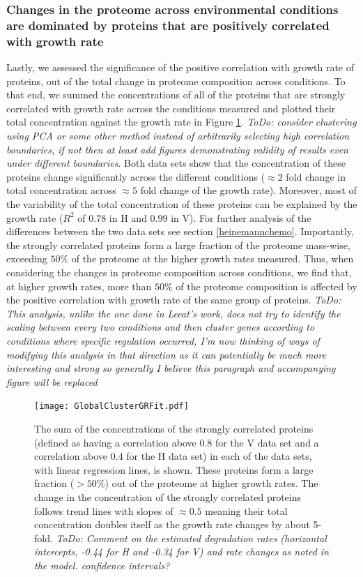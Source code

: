 \documentclass[notitlepage]{article}
\begin{document}
\subsubsection{Changes in the proteome across environmental conditions are dominated by proteins that are positively correlated with growth rate}
Lastly, we assessed the significance of the positive correlation with growth rate of proteins, out of the total change in proteome composition across conditions.
To that end, we summed the concentrations of all of the proteins that are strongly correlated with growth rate across the conditions measured and plotted their total concentration against the growth rate in Figure \ref{fig:globalgrcorr}.
\emph{ToDo: consider clustering using PCA or some other method instead of arbitrarily selecting high correlation boundaries, if not then at least add figures demonstrating validity of results even under different boundaries}.
Both data sets show that the concentration of these proteins change significantly across the different conditions ($\approx 2$ fold change in total concentration across $\approx 5$ fold change of the growth rate).
Moreover, most of the variability of the total concentration of these proteins can be explained by the growth rate ($R^2$ of $0.78$ in H and $0.99$ in V). 
For further analysis of the differences between the two data sets see section \ref{heinemannchemo}.
Importantly, the strongly correlated proteins form a large fraction of the proteome mass-wise, exceeding $50\%$ of the proteome at the higher growth rates measured.
Thus, when considering the changes in proteome composition across conditions, we find that, at higher growth rates, more than $50\%$ of the proteome composition is affected by the positive correlation with growth rate of the same group of proteins.
\emph{ToDo: This analysis, unlike the one done in Leeat's work, does not try to identify the scaling between every two conditions and then cluster genes according to conditions where specific regulation occurred, I'm now thinking of ways of modifying this analysis in that direction as it can potentially be much more interesting and strong so generally I believe this paragraph and accompanying figure will be replaced}

\begin{figure}[h]
\centering
\texttt{[image: GlobalClusterGRFit.pdf]}
\caption{
The sum of the concentrations of the strongly correlated proteins (defined as having a correlation above 0.8 for the V data set and a correlation above 0.4 for the H data set) in each of the data sets, with linear regression lines, is shown.
These proteins form a large fraction ($>50\%$) out of the proteome at higher growth rates.
The change in the concentration of the strongly correlated proteins follows trend lines with slopes of $\approx 0.5$ meaning their total concentration doubles itself as the growth rate changes by about 5-fold.
\emph{ToDo: Comment on the estimated degradation rates (horizontal intercepts, -0.44 for H and -0.34 for V) and rate changes as noted in the model. confidence intervals?}
}
\label{fig:globalgrcorr}
\end{figure}
\end{document}
